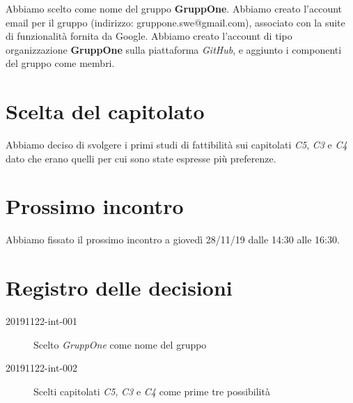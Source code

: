 \documentclass{article}
\begin{document}
Abbiamo scelto come nome del gruppo \textbf{GruppOne}.
Abbiamo creato l'account email per il gruppo (indirizzo: gruppone.swe@gmail.com), associato con la suite di funzionalità fornita da Google.
Abbiamo creato l'account di tipo organizzazione \textbf{GruppOne} sulla piattaforma \textit{GitHub}, e aggiunto i componenti del gruppo come membri.

\section{Scelta del capitolato}%
\label{sec:scelta_del_capitolato}
Abbiamo deciso di svolgere i primi studi di fattibilità sui capitolati \textit{C5}, \textit{C3} e \textit{C4} dato che erano quelli per cui sono state espresse più preferenze.

\section{Prossimo incontro}%
\label{sec:prossimo_incontro}

Abbiamo fissato il prossimo incontro a giovedì 28/11/19 dalle 14:30 alle 16:30.

\newpage
\section{Registro delle decisioni}%
\label{sec:registro_delle_decisioni}

\begin{description}
  \item[20191122-int-001] Scelto \textit{GruppOne} come nome del gruppo
  \item[20191122-int-002] Scelti capitolati \textit{C5}, \textit{C3} e \textit{C4} come prime tre possibilità
\end{description}

\end{document}
